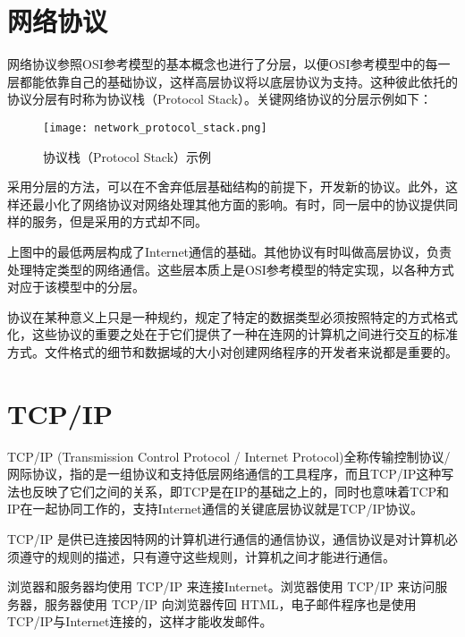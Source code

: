 \section{网络协议}


网络协议参照OSI参考模型的基本概念也进行了分层，以便OSI参考模型中的每一层都能依靠自己的基础协议，这样高层协议将以底层协议为支持。这种彼此依托的协议分层有时称为协议栈（Protocol Stack）。关键网络协议的分层示例如下：


\begin{figure}[!h]
\centering
\texttt{[image: network\_protocol\_stack.png]}
\caption{协议栈（Protocol Stack）示例}
\label{network_protocol_stack}
\end{figure}


采用分层的方法，可以在不舍弃低层基础结构的前提下，开发新的协议。此外，这样还最小化了网络协议对网络处理其他方面的影响。有时，同一层中的协议提供同样的服务，但是采用的方式却不同。


上图中的最低两层构成了Internet通信的基础。其他协议有时叫做高层协议，负责处理特定类型的网络通信。这些层本质上是OSI参考模型的特定实现，以各种方式对应于该模型中的分层。


协议在某种意义上只是一种规约，规定了特定的数据类型必须按照特定的方式格式化，这些协议的重要之处在于它们提供了一种在连网的计算机之间进行交互的标准方式。文件格式的细节和数据域的大小对创建网络程序的开发者来说都是重要的。



\section{TCP/IP}


TCP/IP (Transmission Control Protocol / Internet Protocol)全称传输控制协议/网际协议，指的是一组协议和支持低层网络通信的工具程序，而且TCP/IP这种写法也反映了它们之间的关系，即TCP是在IP的基础之上的，同时也意味着TCP和IP在一起协同工作的，支持Internet通信的关键底层协议就是TCP/IP协议。

TCP/IP 是供已连接因特网的计算机进行通信的通信协议，通信协议是对计算机必须遵守的规则的描述，只有遵守这些规则，计算机之间才能进行通信。

浏览器和服务器均使用 TCP/IP 来连接Internet。浏览器使用 TCP/IP 来访问服务器，服务器使用 TCP/IP 向浏览器传回 HTML，电子邮件程序也是使用 TCP/IP与Internet连接的，这样才能收发邮件。


